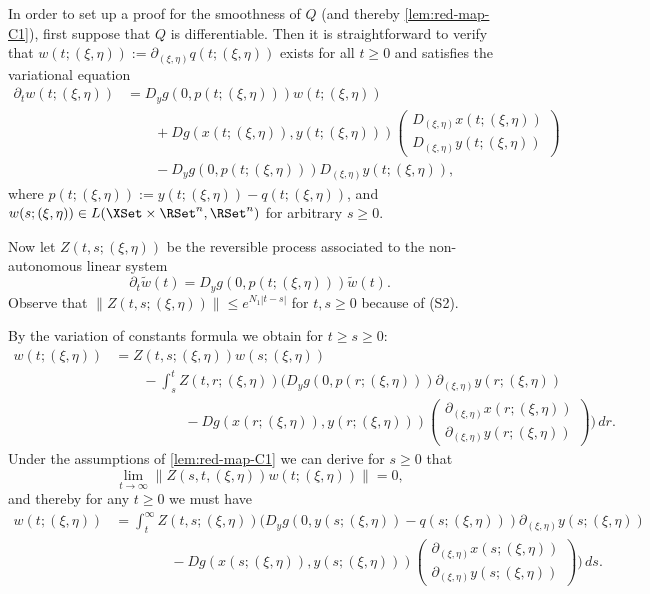 \documentclass[a4paper]{siamart190516}
\begin{document}
In order to set up a proof for the smoothness of $Q$ (and thereby \cref{lem:red-map-C1}), first suppose that $Q$ is differentiable. Then it is straightforward to verify that $w(t;(\xi,\eta)) := \partial_{(\xi,\eta)} q(t;(\xi,\eta))$ exists for all $t \geq 0$ and satisfies the variational equation
\begin{align*}
\partial_t w(t;(\xi,\eta)) &= D_y g(0,p(t;(\xi,\eta))) w(t;(\xi,\eta)) \\
&\qquad + D g(x(t;(\xi,\eta)),y(t;(\xi,\eta))) \begin{pmatrix} D_{(\xi,\eta)}x(t; (\xi,\eta)) \\ D_{(\xi,\eta)}y(t; (\xi,\eta)) \end{pmatrix}  \\
&\qquad -  D_y g(0,p(t;(\xi,\eta))) D_{(\xi,\eta)}y(t; (\xi,\eta)),
\end{align*}
where $p(t; (\xi,\eta)) := y(t;(\xi,\eta)) - q(t; (\xi,\eta))$, and $w(s;(\xi,\eta)) \in L(\XSet \times \RSet^n, \RSet^n)$ for arbitrary $s \geq 0$.

Now let $Z(t,s; (\xi,\eta))$ be the reversible process associated to the non-autonomous linear system
\[
\partial_t \tilde{w}(t) = D_y g(0,p(t;(\xi,\eta))) \tilde{w}(t).
\]
Observe that $ \|Z(t,s; (\xi,\eta))\| \leq e^{N_1 |t-s|}$ for $t,s \geq 0$ because of (S2). 

By the variation of constants formula we obtain for $t \geq s \geq 0$:
\begin{align*}
w(t; (\xi,\eta)) &= Z(t,s; (\xi,\eta)) w(s;(\xi,\eta)) \\
&\qquad - \int_s^t Z(t,r; (\xi,\eta)) \Bigg( D_y g(0,p(r;(\xi,\eta))) \partial_{(\xi,\eta)}y(r; (\xi,\eta))  \\
&\qquad \qquad \quad - D g(x(r;(\xi,\eta)),y(r;(\xi,\eta))) \begin{pmatrix} \partial_{(\xi,\eta)}x(r; (\xi,\eta)) \\ \partial_{(\xi,\eta)}y(r; (\xi,\eta)) \end{pmatrix} \Bigg) \, dr.
\end{align*}
Under the assumptions of \cref{lem:red-map-C1} we can derive for $s \geq 0$ that
 \[
 \lim_{t \rightarrow \infty}  \|  Z(s,t, (\xi,\eta)) w(t; (\xi,\eta)) \| = 0,
 \]
  and thereby for any $t \geq 0$ we must have
\begin{align*}
w(t;(\xi,\eta))  &=  \int_t^{\infty} Z(t,s; (\xi,\eta)) \Bigg( D_y g(0,y(s;(\xi,\eta)) - q(s;(\xi,\eta))) \partial_{(\xi,\eta)}y(s; (\xi,\eta))  \\
&\qquad \qquad - D g(x(s;(\xi,\eta)),y(s;(\xi,\eta))) \begin{pmatrix} \partial_{(\xi,\eta)}x(s; (\xi,\eta)) \\ \partial_{(\xi,\eta)}y(s; (\xi,\eta)) \end{pmatrix} \Bigg) \, ds.
\end{align*}
\end{document}
